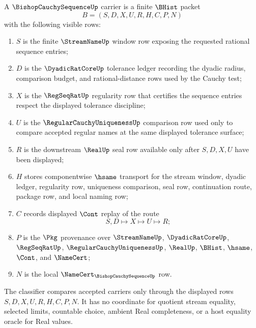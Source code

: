 \begin{definition}
\label{def:bishop-cauchy-sequence-carrier}
A $\BishopCauchySequenceUp$ carrier is a finite $\BHist$ packet
$$
B=(S,D,X,U,R,H,C,P,N)
$$
with the following visible rows:
\begin{enumerate}
\item $S$ is the finite $\StreamNameUp$ window row exposing the requested rational sequence entries;
\item $D$ is the $\DyadicRatCoreUp$ tolerance ledger recording the dyadic radius, comparison budget, and rational-distance rows used by the Cauchy test;
\item $X$ is the $\RegSeqRatUp$ regularity row that certifies the sequence entries respect the displayed tolerance discipline;
\item $U$ is the $\RegularCauchyUniquenessUp$ comparison row used only to compare accepted regular names at the same displayed tolerance surface;
\item $R$ is the downstream $\RealUp$ seal row available only after $S,D,X,U$ have been displayed;
\item $H$ stores componentwise $\hsame$ transport for the stream window, dyadic ledger, regularity row, uniqueness comparison, seal row, continuation route, package row, and local naming row;
\item $C$ records displayed $\Cont$ replay of the route
$$
S,D \longmapsto X \longmapsto U \longmapsto R ;
$$
\item $P$ is the $\Pkg$ provenance over $\StreamNameUp$, $\DyadicRatCoreUp$, $\RegSeqRatUp$, $\RegularCauchyUniquenessUp$, $\RealUp$, $\BHist$, $\hsame$, $\Cont$, and $\NameCert$;
\item $N$ is the local $\NameCert_{\BishopCauchySequenceUp}$ row.
\end{enumerate}
The classifier compares accepted carriers only through the displayed rows $S,D,X,U,R,H,C,P,N$. It has no coordinate for quotient stream equality, selected limits, countable choice, ambient Real completeness, or a host equality oracle for Real values.
\end{definition}

